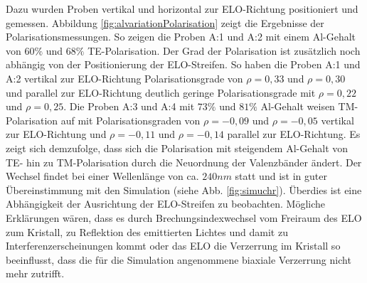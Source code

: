 %
Dazu wurden Proben vertikal und horizontal zur ELO-Richtung positioniert und gemessen. Abbildung \ref{fig:alvariationPolarisation} zeigt die Ergebnisse der Polarisationsmessungen. So zeigen die Proben A:1 und A:2 mit einem Al-Gehalt von $60\%$ und $68\%$ TE-Polarisation. Der Grad der Polarisation ist zus\"atzlich noch abh\"angig von der Positionierung der ELO-Streifen. So haben die Proben A:1 und A:2 vertikal zur ELO-Richtung Polarisationsgrade von $\rho = 0,33$ und $\rho = 0,30$ und parallel zur ELO-Richtung deutlich geringe Polarisationsgrade mit $\rho = 0,22$ und $\rho = 0,25$. Die Proben A:3 und A:4 mit $73\%$ und $81\%$ Al-Gehalt weisen TM-Polarisation auf mit Polarisationsgraden von $\rho = -0,09$ und $\rho = -0,05$ vertikal zur ELO-Richtung und $\rho = -0,11$ und $\rho = -0,14$ parallel zur ELO-Richtung. Es zeigt sich demzufolge, dass sich die Polarisation mit steigendem Al-Gehalt von TE- hin zu TM-Polarisation durch die Neuordnung der Valenzb\"ander \"andert. Der Wechsel findet bei einer Wellenl\"ange von ca. $240nm$ statt und ist in guter \"Ubereinstimmung mit den Simulation (siehe Abb. \ref{fig:simuchr}). \"Uberdies ist eine Abh\"angigkeit der Ausrichtung der ELO-Streifen zu beobachten. M\"ogliche Erkl\"arungen w\"aren, dass es durch Brechungsindexwechsel vom Freiraum des ELO zum Kristall, zu Reflektion des emittierten Lichtes und damit zu Interferenzerscheinungen kommt oder das ELO die Verzerrung im Kristall so beeinflusst, dass die f\"ur die Simulation angenommene biaxiale Verzerrung nicht mehr zutrifft. 

